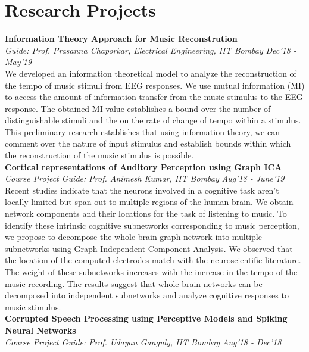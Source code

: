 \documentclass[margin,line, 9pt]{res}
\begin{document}
\section{\sc Research Projects}
{\bf Information Theory Approach for Music Reconstrution} \\
{\em Guide: Prof. Prasanna Chaporkar, Electrical Engineering, IIT Bombay} \hfill {\it Dec'18 - May'19}\\
We developed an information theoretical model to analyze the reconstruction of the tempo of music stimuli from EEG responses. We use mutual information (MI) to access the amount of information transfer from the music stimulus to the EEG response. The obtained MI value establishes a bound over the number of distinguishable stimuli and the on the rate of change of tempo within a stimulus. This preliminary research establishes that using information theory, we can comment over the nature of input stimulus and establish bounds within which the reconstruction of the music stimulus is possible. 
\vspace{.1in} \\
% 
{\bf Cortical representations of Auditory Perception using Graph ICA} \\
{\em Course Project Guide: Prof. Animesh Kumar, IIT Bombay} \hfill {\it Aug'18 - June'19}\\
Recent studies indicate that the neurons involved in a cognitive task aren’t locally limited but span out to multiple regions of the human brain. We obtain network components and their locations for the task of listening to music. To identify these intrinsic cognitive subnetworks corresponding to music perception, we propose to decompose the whole brain graph-network into multiple subnetworks using Graph Independent Component Analysis. We observed that the location of the computed electrodes match with the neuroscientific literature. The weight of these subnetworks increases with the increase in the tempo of the music recording. The results suggest that whole-brain networks can be decomposed into independent subnetworks and analyze cognitive responses to music stimulus.
\vspace{.1in} \\ 
% 
{\bf Corrupted Speech Processing using Perceptive Models and Spiking Neural Networks} \\
{\em Course Project Guide: Prof. Udayan Ganguly, IIT Bombay} \hfill {\it Aug'18 - Dec'18}\\
\end{document}
